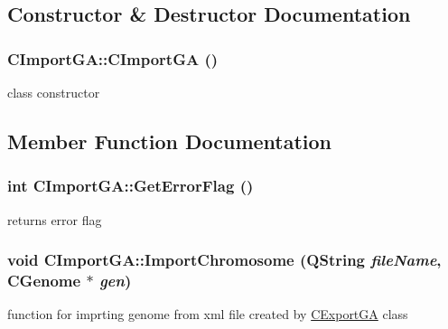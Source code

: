 \subsection{Constructor \& Destructor Documentation}
\hypertarget{classCImportGA_ae697ea4a3cee45b973e6331422dde4c0}{
\subsubsection[{CImportGA}]{\setlength{\rightskip}{0pt plus 5cm}CImportGA::CImportGA ()}}
\label{classCImportGA_ae697ea4a3cee45b973e6331422dde4c0}
class constructor 

\subsection{Member Function Documentation}
\hypertarget{classCImportGA_aee42b056447a05412413fdad4f2d233b}{
\subsubsection[{GetErrorFlag}]{\setlength{\rightskip}{0pt plus 5cm}int CImportGA::GetErrorFlag ()}}
\label{classCImportGA_aee42b056447a05412413fdad4f2d233b}
returns error flag \hypertarget{classCImportGA_a384bf039491b76cac0d07225e479ce26}{
\subsubsection[{ImportChromosome}]{\setlength{\rightskip}{0pt plus 5cm}void CImportGA::ImportChromosome (QString {\em fileName}, \/  {\bf CGenome} $\ast$ {\em gen})}}
\label{classCImportGA_a384bf039491b76cac0d07225e479ce26}
function for imprting genome from xml file created by \hyperlink{classCExportGA}{CExportGA} class


